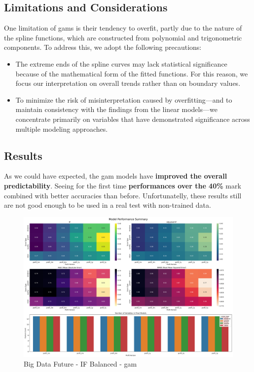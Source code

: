 \documentclass[11pt,english,a4paper,hidelinks]{book}
\begin{document}
\subsection{Limitations and Considerations}

\noindent One limitation of \acrshort{gam}s is their tendency to overfit, partly due to the nature of the spline functions, which are constructed from polynomial and trigonometric components. To address this, we adopt the following precautions:
\begin{itemize}
    \item The extreme ends of the spline curves may lack statistical significance because of the mathematical form of the fitted functions. For this reason, we focus our interpretation on overall trends rather than on boundary values.
    \item To minimize the risk of misinterpretation caused by overfitting—and to maintain consistency with the findings from the linear models—we concentrate primarily on variables that have demonstrated significance across multiple modeling approaches.
\end{itemize}

\subsection{Results}

\noindent As we could have expected, the \acrshort{gam} models have \textbf{improved the overall predictability}. Seeing for the first time \textbf{performances over the 40\%} mark combined with better accuracies than before. Unfortunatelly, these results still are not good enough to be used in a real test with non-trained data.

\begin{figure}[H]
    \centering
    \includegraphics[width=1\textwidth]{images/code/models/general_regression/Big Data future - IF HARD Balanced performance.png}
    \caption{Big Data Future - IF Balanced - \acrshort{gam}}
    \label{fig:gam_linear_regression}
\end{figure}
\end{document}

